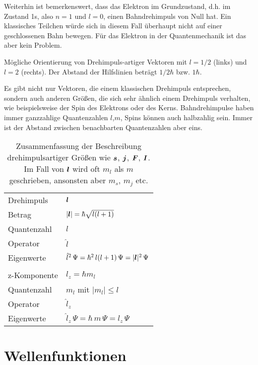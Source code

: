 Weiterhin ist bemerkenswert, dass das Elektron im Grundzustand, d.h. im Zustand 1s, also $n=1$ und $l=0$, einen Bahndrehimpuls von Null hat. Ein klassisches Teilchen würde sich in diesem Fall überhaupt nicht auf einer geschlossenen Bahn bewegen. Für das Elektron in der Quantenmechanik ist das aber kein Problem.

\begin{marginfigure}
    \caption{Mögliche Orientierung von  Drehimpuls-artiger Vektoren mit $l=1/2$ (links) und $l=2$ (rechts). Der Abstand der Hilfslinien beträgt $1/2 \hbar$ bzw. $1\hbar$.}
\end{marginfigure}

Es gibt nicht nur Vektoren, die einem klassischen Drehimpuls entsprechen, sondern auch anderen Größen, die sich sehr ähnlich einem Drehimpuls verhalten, wie beispielsweise der Spin des Elektrons oder des Kerns. Bahndrehimpulse haben immer ganzzahlige Quantenzahlen $l$,$m$, Spins können auch halbzahlig sein. Immer ist der Abstand zwischen benachbarten Quantenzahlen aber eins. 


\begin{table}
    \begin{tabular}{ll}
        Drehimpuls & $\boldsymbol{l}$ \\
        Betrag & $|\boldsymbol{l}| = \hbar \sqrt{l (l+1) }$ \\
        Quantenzahl & $l$ \\
        Operator & $\hat{l}$ \\
        Eigenwerte &  $\hat{l}^2 \,  \Psi =  \hbar^2 \, l (l +1 )\,  \Psi  =|\boldsymbol{l}|^2 \, \Psi $\\ 
        & \\
        z-Komponente & $l_z = \hbar m_l$ \\
        Quantenzahl & $m_l$ mit $|m_l| \le l$ \\
        Operator & $\hat{l}_z$ \\
        Eigenwerte &  $\hat{l}_z\,  \Psi =  \hbar \, m \,  \Psi  = l_z \, \Psi $\\ 
    \end{tabular}
\caption{Zusammenfassung der Beschreibung drehimpulsartiger Größen wie $\boldsymbol{s}$, $\boldsymbol{j}$, $\boldsymbol{F}$, $\boldsymbol{I}$. Im Fall von $\boldsymbol{l}$ wird oft $m_l$ als $m$ geschrieben, ansonsten aber $m_s$, $m_j$ etc.}
\end{table}


\section{Wellenfunktionen}

